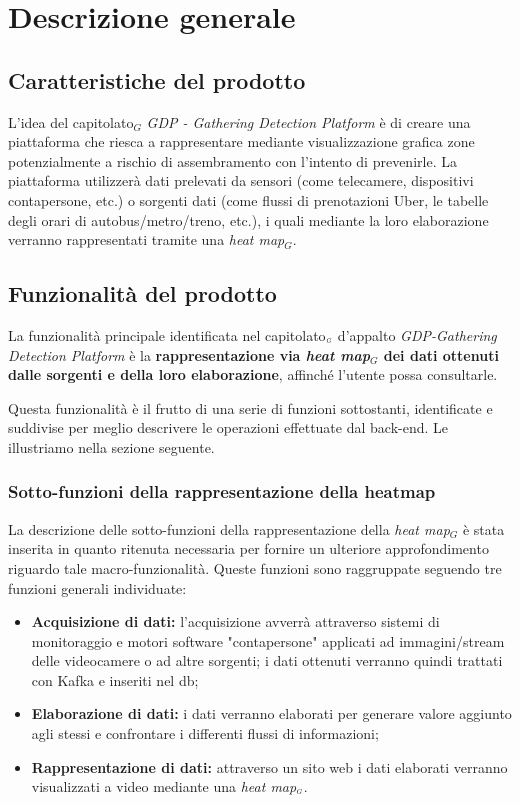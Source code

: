 \chapter{Descrizione generale}\label{DescrizioneGenerale}
\section{Caratteristiche del prodotto}\label{DescrizioneGeneraleCaratteristicheProdotto}
L'idea del capitolato$_G$ \textit{GDP - Gathering Detection Platform} è di creare una piattaforma che riesca a rappresentare mediante visualizzazione grafica zone potenzialmente a rischio di assembramento con l'intento di prevenirle.
La piattaforma utilizzerà dati prelevati da sensori (come telecamere, dispositivi contapersone, etc.) o sorgenti dati (come flussi di prenotazioni Uber, le tabelle degli orari di autobus/metro/treno, etc.), i quali mediante la loro elaborazione verranno rappresentati tramite una \textit{heat map$_G$}.

\section{Funzionalità del prodotto}\label{DescrizioneGeneraleFunzionalitàDelProdotto}
La funzionalità principale identificata nel capitolato$_{\scaleto{G}{3pt}}$ d'appalto \textit{GDP-Gathering Detection Platform} è la \textbf{rappresentazione via \textit{heat map$_G$} dei dati ottenuti dalle sorgenti e della loro elaborazione}, affinché l'utente possa consultarle.

Questa funzionalità è il frutto di una serie di funzioni sottostanti, identificate e suddivise per meglio descrivere le operazioni effettuate dal back-end.
Le illustriamo nella sezione seguente.

\subsection{Sotto-funzioni della rappresentazione della heatmap}\label{DescrizioneGeneraleFunzionalitàDelProdottoSottoFunzioniDellaRappresentazioneDellaHeatmap}

La descrizione delle sotto-funzioni della rappresentazione della \textit{heat map$_G$} è stata inserita in quanto ritenuta necessaria per fornire un ulteriore approfondimento riguardo tale macro-funzionalità.
Queste funzioni sono raggruppate seguendo tre funzioni generali individuate:
\begin{itemize}
	\item \textbf{Acquisizione di dati:} l'acquisizione avverrà attraverso sistemi di monitoraggio e motori software "contapersone" applicati ad immagini/stream delle videocamere o ad altre sorgenti; i dati ottenuti verranno quindi trattati con Kafka e inseriti nel db;
	\item \textbf{Elaborazione di dati:} i dati verranno elaborati per generare valore aggiunto agli stessi e confrontare i differenti flussi di informazioni;
	\item \textbf{Rappresentazione di dati:} attraverso un sito web i dati elaborati verranno visualizzati a video mediante una \textit{heat map$_{\scaleto{G}{3pt}}$}.
\end{itemize}

